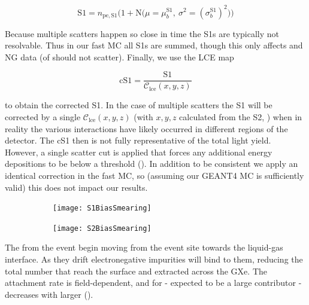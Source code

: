\begin{equation}
\mathrm{S1} = n_{\mathrm{pe,S1}} \Big( 1 + \mathrm{N} \big( \mu = \mu_{b}^{\mathrm{S1}},\ \sigma^2 = (\sigma_{b}^{\mathrm{S1}})^2 \big)
\Big)
\label{eq:er_nr_calibrations_parameter_determ_det_phys_s1_bias_smear}
\end{equation}

Because multiple scatters happen so close in time the S1s are typically not resolvable.  Thus in our fast MC all S1s are summed, though
this only affects \ambe and NG data (\betadecay of  should not scatter).  Finally, we use the LCE map

\begin{equation}
\mathrm{cS1} = \frac{\mathrm{S1}}{\mathcal{C}_{\mathrm{lce}}(x, y, z)}
\label{eq:er_nr_calibrations_parameter_determ_det_phys_cs1}
\end{equation}

\noindent to obtain the corrected S1.  In the case of multiple scatters the S1 will be corrected by a single $\mathcal{C}_{\mathrm{lce}}(x, y, z)$
(with $x, y, z$ calculated from the S2, ) when in reality the various interactions have
likely occurred in different regions of the detector.  The cS1 then is not fully representative of the total light yield.  However,
a single scatter cut is applied that forces any additional energy depositions to be below a threshold
().  In addition to be
consistent we apply an identical correction in the fast MC, so (assuming our GEANT4 MC is sufficiently valid) this does not impact our
results.

\begin{figure}
    \centering
    \begin{subfigure}[t]{0.45\textwidth}
        \centering
        \texttt{[image: S1BiasSmearing]}
    \end{subfigure}%
    \begin{subfigure}[t]{0.45\textwidth}
        \centering
        \texttt{[image: S2BiasSmearing]}
    \end{subfigure}
    \caption{}
	\label{fig:er_nr_calibrations_parameter_determ_det_phys_bias_smear}
\end{figure}

The \electron from the event begin moving from the event site towards the liquid-gas interface.  As they drift electronegative
impurities will bind to them, reducing the total number that reach the surface and extracted across the GXe.  The attachment rate
is field-dependent, and for  - expected to be a large contributor - decreases with larger \ed
().

